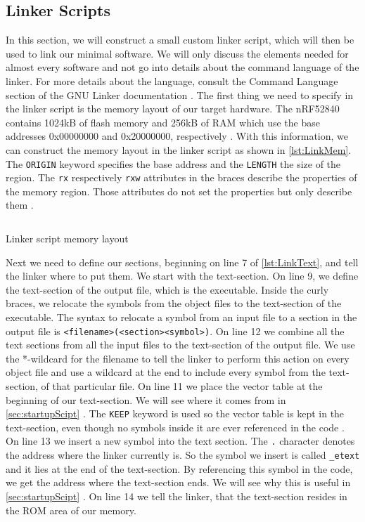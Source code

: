 \documentclass[a4paper,12pt]{article}
\newcommand{\secref}[1]{\autoref{#1} \nameref{#1}}
\newcommand{\inlinebash}[1]{\texttt{#1}}
\begin{document}
\subsection{Linker Scripts}\label{sec:linkerScript}
In this section, we will construct a small custom linker script, which will then be used to link our minimal software. We will only discuss the elements needed for almost every software and not go into details about the command language of the linker. For more details about the language, consult the Command Language section of the GNU Linker documentation \cite{GNUBInutils}. The first thing we need to specify in the linker script is the memory layout of our target hardware. The nRF52840 contains 1024kB of flash memory and 256kB of \ac{RAM} which use the base addresses 0x00000000 and 0x20000000, respectively \cite{nrf52840Specification}. With this information, we can construct the memory layout in the linker script as shown in \autoref{lst:LinkMem}. The \inlinebash{ORIGIN} keyword specifies the base address and the \inlinebash{LENGTH} the size of the region. The \inlinebash{rx} respectively \inlinebash{rxw} attributes in the braces describe the properties of the memory region. Those attributes do not set the properties but only describe them \cite{GNUBInutils}.

\begin{listing}[H]
  \inputminted[firstline=1, lastline=5]{bash}{code/nrf52840_report_ld.ld}
  \caption{Linker script memory layout}
  \label{lst:LinkMem}
\end{listing}

Next we need to define our sections, beginning on line 7 of \autoref{lst:LinkText}, and tell the linker where to put them. We start with the text-section. On line 9, we define the text-section of the output file, which is the executable. Inside the curly braces, we relocate the symbols from the object files to the text-section of the executable. The syntax to relocate a symbol from an input file to a section in the output file is \inlinebash{<filename>(<section><symbol>)}. On line 12 we combine all the text sections from all the input files to the text-section of the output file. We use the *-wildcard for the filename to tell the linker to perform this action on every object file and use a wildcard at the end to include every symbol from the text-section, of that particular file. On line 11 we place the vector table at the beginning of our text-section. We will see where it comes from in \secref{sec:startupScipt}. The \inlinebash{KEEP} keyword is used so the vector table is kept in the text-section, even though no symbols inside it are ever referenced in the code \cite{OSdevWiki}. On line 13 we insert a new symbol into the text section. The \inlinebash{.} character denotes the address where the linker currently is. So the symbol we insert is called \inlinebash{_etext} and it lies at the end of the text-section. By referencing this symbol in the code, we get the address where the text-section ends. We will see why this is useful in \secref{sec:startupScipt}. On line 14 we tell the linker, that the text-section resides in the \ac{ROM} area of our memory.
\end{document}
